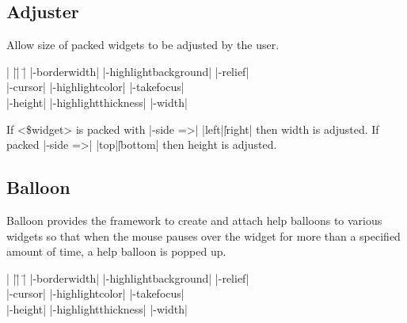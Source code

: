 \begin{enum}{1cm}
\end{enum}

\subsection*{Adjuster}
Allow size of packed widgets to be adjusted by the user.
\vskip5pt
\vspace{-4pt}

\begin{tabbing}
|                   |\=|                     |\= \kill
|-borderwidth|      \> |-highlightbackground| \> |-relief| \\
|-cursor|           \> |-highlightcolor|      \> |-takefocus| \\
|-height|	    \> |-highlightthickness|  \> |-width| \\
\end{tabbing}

\vskip5pt

\begin{enum}{1cm}

If <\$widget> is packed with |-side =>| |left|\||right| then width is adjusted.
If packed |-side =>| |top|\||bottom| then height is adjusted. 

\end{enum}

\subsection*{Balloon}
Balloon provides the framework to create and attach help
balloons to various widgets so that when the mouse pauses
over the widget for more than a specified amount of time,
a help balloon is popped up.
\vskip5pt
\vspace{-4pt}

\begin{tabbing}
|                   |\=|                     |\= \kill
|-borderwidth| \> |-highlightbackground|     \> |-relief| \\   
|-cursor|      \> |-highlightcolor|          \> |-takefocus| \\
|-height|      \> |-highlightthickness|      \> |-width| \\
\end{tabbing}

\vskip5pt

